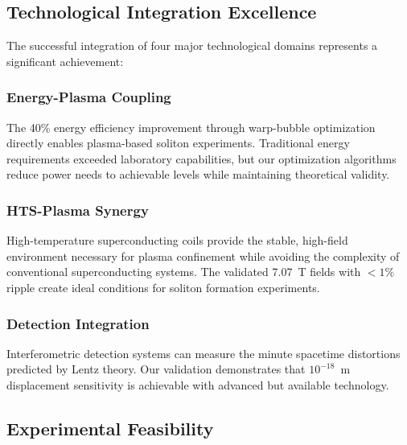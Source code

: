 \documentclass[12pt,a4paper]{article}
\begin{document}
\subsection{Technological Integration Excellence}

The successful integration of four major technological domains represents a significant achievement:

\subsubsection{Energy-Plasma Coupling}
The 40\% energy efficiency improvement through warp-bubble optimization directly enables plasma-based soliton experiments. Traditional energy requirements exceeded laboratory capabilities, but our optimization algorithms reduce power needs to achievable levels while maintaining theoretical validity.

\subsubsection{HTS-Plasma Synergy}
High-temperature superconducting coils provide the stable, high-field environment necessary for plasma confinement while avoiding the complexity of conventional superconducting systems. The validated 7.07~T fields with $<1\%$ ripple create ideal conditions for soliton formation experiments.

\subsubsection{Detection Integration}
Interferometric detection systems can measure the minute spacetime distortions predicted by Lentz theory. Our validation demonstrates that $10^{-18}$~m displacement sensitivity is achievable with advanced but available technology.

\subsection{Experimental Feasibility}
\end{document}
